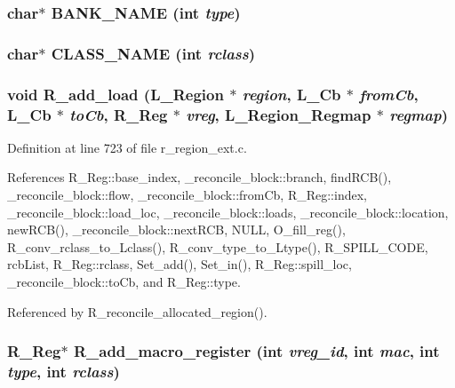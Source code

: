 \subsubsection{\setlength{\rightskip}{0pt plus 5cm}char$\ast$ BANK\_\-NAME (int {\em type})}\label{r__regproto_8h_051a7ad6a6187411dc94287c4383706f}


\subsubsection{\setlength{\rightskip}{0pt plus 5cm}char$\ast$ CLASS\_\-NAME (int {\em rclass})}\label{r__regproto_8h_4a0dc00a9c54e0e914a7cddc0d2f76c9}


\subsubsection{\setlength{\rightskip}{0pt plus 5cm}void R\_\-add\_\-load (L\_\-Region $\ast$ {\em region}, L\_\-Cb $\ast$ {\em from\-Cb}, L\_\-Cb $\ast$ {\em to\-Cb}, \bf{R\_\-Reg} $\ast$ {\em vreg}, L\_\-Region\_\-Regmap $\ast$ {\em regmap})}\label{r__regproto_8h_d77e410507946cbea3e5146883f47c28}




Definition at line 723 of file r\_\-region\_\-ext.c.

References R\_\-Reg::base\_\-index, \_\-reconcile\_\-block::branch, find\-RCB(), \_\-reconcile\_\-block::flow, \_\-reconcile\_\-block::from\-Cb, R\_\-Reg::index, \_\-reconcile\_\-block::load\_\-loc, \_\-reconcile\_\-block::loads, \_\-reconcile\_\-block::location, new\-RCB(), \_\-reconcile\_\-block::next\-RCB, NULL, O\_\-fill\_\-reg(), R\_\-conv\_\-rclass\_\-to\_\-Lclass(), R\_\-conv\_\-type\_\-to\_\-Ltype(), R\_\-SPILL\_\-CODE, rcb\-List, R\_\-Reg::rclass, Set\_\-add(), Set\_\-in(), R\_\-Reg::spill\_\-loc, \_\-reconcile\_\-block::to\-Cb, and R\_\-Reg::type.

Referenced by R\_\-reconcile\_\-allocated\_\-region().
\subsubsection{\setlength{\rightskip}{0pt plus 5cm}\bf{R\_\-Reg}$\ast$ R\_\-add\_\-macro\_\-register (int {\em vreg\_\-id}, int {\em mac}, int {\em type}, int {\em rclass})}\label{r__regproto_8h_1e12fbd27bb841ddcd92e9be4fb282c9}




